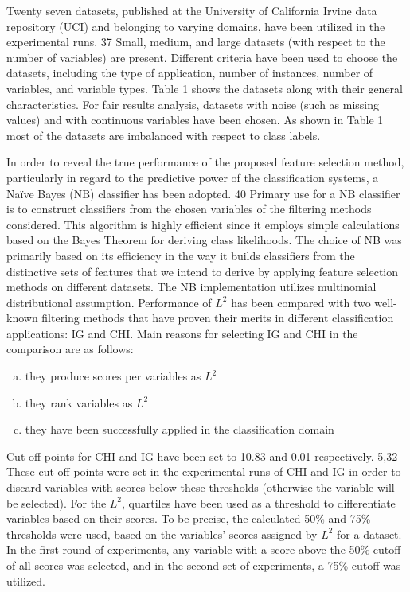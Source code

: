 \documentclass[review]{elsarticle}
\begin{document}
Twenty seven datasets, published at the University of California Irvine data repository (UCI) and belonging to varying domains, have been utilized in the experimental runs.\cite{Asuncion2007} 37  Small, medium, and large datasets (with respect to the number of variables) are present. Different criteria have been used to choose the datasets, including the type of application, number of instances, number of variables, and variable types. Table 1 shows the datasets along with their general characteristics.  For fair results analysis, datasets with noise (such as missing values) and with continuous variables have been chosen. As shown in Table 1 most of the datasets are imbalanced with respect to class labels.

In order to reveal the true performance of the proposed feature selection method, particularly in regard to the predictive power of the classification systems, a Naïve Bayes (NB) classifier has been adopted.\cite{Hand2001} 40 Primary use for a NB classifier is to construct classifiers from the chosen variables of the filtering methods considered. This algorithm is highly efficient since it employs simple calculations based on the Bayes Theorem for deriving class likelihoods. The choice of NB was primarily based on its efficiency in the way it builds classifiers from the distinctive sets of features that we intend to derive by applying feature selection methods on different datasets. The NB implementation utilizes multinomial distributional assumption. Performance of $ L^2 $ has been compared with two well-known filtering methods that have proven their merits in different classification applications: IG and CHI. Main reasons for selecting IG and CHI in the comparison are as follows:

\begin{enumerate}[(a)]
	\item they produce scores per variables as $ L^2 $
	\item they rank variables as $ L^2 $
	\item they have been successfully applied in the classification domain
	
\end{enumerate}

Cut-off points for CHI and IG have been set to 10.83 and 0.01 respectively.\cite{Kamalov2017, Liu1995} 5,32  These cut-off points were set in the experimental runs of CHI and IG in order to discard variables with scores below these thresholds (otherwise the variable will be selected). For the $ L^2 $, quartiles have been used as a threshold to differentiate variables based on their scores. To be precise, the calculated 50\% and 75\% thresholds were used, based on the variables’ scores assigned by $ L^2 $ for a dataset. In the first round of experiments, any variable with a score above the 50\% cutoff of all scores was selected, and in the second set of experiments, a 75\% cutoff was utilized.  
\end{document}
